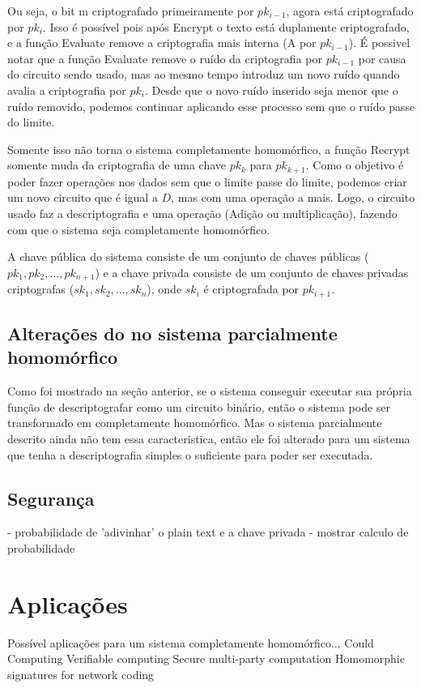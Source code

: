   Ou seja, o bit m criptografado primeiramente por \( pk_{i-1} \), agora está criptografado por \( pk_{i} \).
  Isso é possível pois após Encrypt o texto está duplamente criptografado, e a função Evaluate remove a criptografia mais interna (A por \(pk_{i-1}\)).
  É possivel notar que a função Evaluate remove o ruído da criptografia por \(pk_{i-1}\) por causa do circuito sendo usado, mas ao mesmo tempo introduz um novo ruído quando avalia a criptografia por \(pk_i\).
  Desde que o novo ruído inserido seja menor que o ruído removido, podemos continuar aplicando esse processo sem que o ruído passe do limite.
  
  Somente isso não torna o sistema completamente homomórfico, a função Recrypt somente muda da criptografia de uma chave \(pk_k\) para \(pk_{k+1}\).
  Como o objetivo é poder fazer operações nos dados sem que o limite passe do limite, podemos criar um novo circuito que é igual a \(D\), mas com uma operação a mais.
  Logo, o circuito usado faz a descriptografia e uma operação (Adição ou multiplicação), fazendo com que o sistema seja completamente homomórfico.
  
  A chave pública do sistema consiste de um conjunto de chaves públicas (\(pk_1, pk_2, ..., pk_{n+1}\)) e a chave privada consiste de um conjunto de chaves privadas criptografas (\(sk_1, sk_2, ..., sk_n\)), onde \(sk_i\) é criptografada por \(pk_{i+1}\).

  \subsection{Alterações do no sistema parcialmente homomórfico}
  
  Como foi mostrado na seção anterior, se o sistema conseguir executar sua própria função de descriptografar como um circuito binário, então o sistema pode ser transformado em completamente homomórfico.
  Mas o sistema parcialmente descrito ainda não tem essa caracteristica, então ele foi alterado para um sistema que tenha a descriptografia simples o suficiente para poder ser executada.
  
  


\subsection{Segurança}
- probabilidade de 'adivinhar' o plain text e a chave privada
- mostrar calculo de probabilidade


\section{Aplicações}\label{sec:LABEL_CHP_1_SEC_E}
Possível aplicações para um sistema completamente homomórfico...
Could Computing
Verifiable computing
Secure multi-party computation
Homomorphic signatures for network coding

